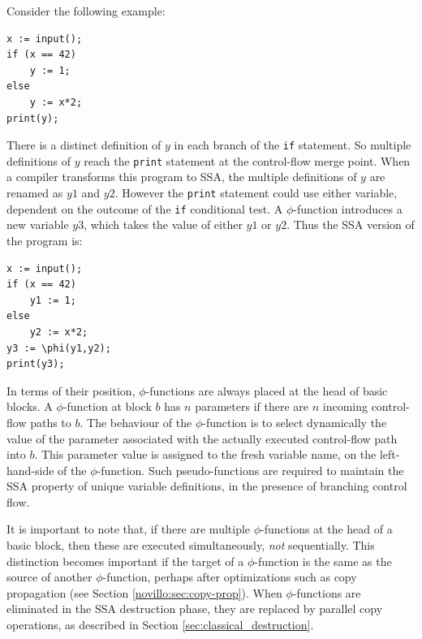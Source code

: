 Consider the following example:

\begin{verbatim}
x := input();
if (x == 42)
    y := 1;
else
    y := x*2;
print(y);
\end{verbatim}

There is a distinct definition of $y$ in each branch of the \texttt{if}
statement. So multiple definitions of $y$ reach the \texttt{print} statement
at the control-flow merge point. When a compiler transforms this program 
to SSA,
the multiple definitions of $y$ are renamed as $y1$ and $y2$. However 
the \texttt{print} statement could use either variable, dependent on the
outcome of the \texttt{if} conditional test. A $\phi$-function introduces
a new variable $y3$, which takes the value of either $y1$ or $y2$.
Thus the SSA version of the program is:

\begin{verbatim}
x := input();
if (x == 42)
    y1 := 1;
else
    y2 := x*2;
y3 := \phi(y1,y2);
print(y3);
\end{verbatim}



In terms of their position, 
$\phi$-functions are always placed at the head of basic blocks.
A $\phi$-function at block $b$ has
$n$ parameters if there are $n$ incoming control-flow paths to $b$.
The behaviour of the $\phi$-function is to select dynamically
the value of the parameter associated with the actually executed
control-flow path into $b$.
This parameter value is assigned to the fresh variable name,
on the left-hand-side of the $\phi$-function.
Such pseudo-functions are required to maintain the SSA property
of unique variable definitions,
in the presence of branching control flow.


It is important to note that, if there are multiple $\phi$-functions
at the head of a basic block, then these are executed simultaneously,
\textit{not} sequentially.
This distinction becomes important if the target of a $\phi$-function
is the same as the source of another $\phi$-function, perhaps after
optimizations such as copy propagation
(see Section \ref{novillo:sec:copy-prop}).
When $\phi$-functions are eliminated in the SSA destruction phase,
they are replaced by parallel copy operations,
as described in Section \ref{sec:classical_destruction}.

